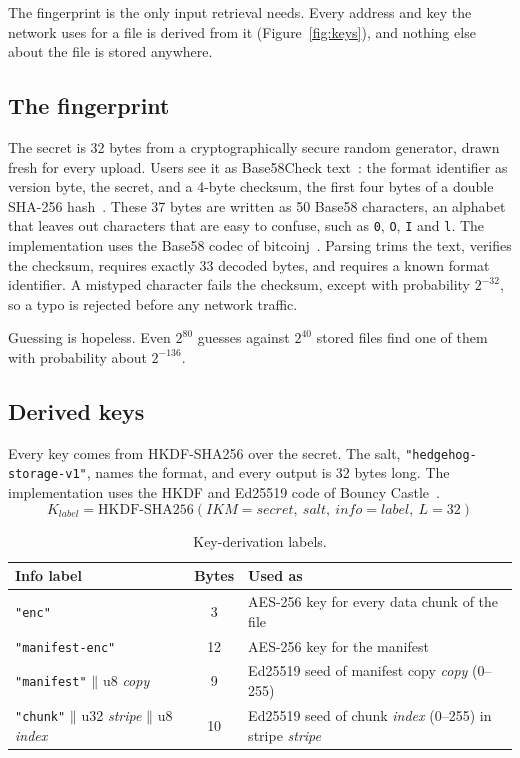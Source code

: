 \documentclass[10pt,a4paper,final]{article}
\newcommand{\code}[1]{\texttt{#1}}
\newcommand{\cat}{\mathbin{\|}}
\begin{document}
The fingerprint is the only input retrieval needs. Every address and key the network uses for a file is derived
from it (Figure~\ref{fig:keys}), and nothing else about the file is stored anywhere.

\subsection{The fingerprint}

The secret is 32 bytes from a cryptographically secure random generator, drawn fresh for every upload. Users see it
as Base58Check text~\cite{base58check}: the format identifier as version byte, the secret, and a 4-byte checksum,
the first four bytes of a double SHA-256 hash~\cite{fips1804}. These 37 bytes are written as 50 Base58 characters,
an alphabet that leaves out characters that are easy to confuse, such as \code{0}, \code{O}, \code{I} and \code{l}. The
implementation uses the Base58 codec of bitcoinj~\cite{bitcoinj}. Parsing trims the text, verifies the checksum,
requires exactly 33 decoded bytes, and requires a known format identifier. A mistyped character fails the checksum,
except with probability $2^{-32}$, so a typo is rejected before any network traffic.

Guessing is hopeless. Even $2^{80}$ guesses against $2^{40}$ stored files find one of them with probability about
$2^{-136}$.

\subsection{Derived keys}

Every key comes from HKDF-SHA256 over the secret. The salt, \code{"hedgehog-storage-v1"}, names the format, and
every output is 32 bytes long. The implementation uses the HKDF and Ed25519 code of Bouncy
Castle~\cite{bouncycastle}.
\begin{equation}
	K_{\mathit{label}} = \mathrm{HKDF\text{-}SHA256}(\mathit{IKM} = \mathit{secret},\ \mathit{salt},\ \mathit{info}
	= \mathit{label},\ L = 32)
\end{equation}

\begin{table}[H]
\centering
\small
\begin{tabularx}{\linewidth}{@{}p{4.6cm}cL@{}}
\toprule
Info label & Bytes & Used as \\
\midrule
\code{"enc"} & 3 & AES-256 key for every data chunk of the file \\
\code{"manifest-enc"} & 12 & AES-256 key for the manifest \\
\code{"manifest"} $\cat$ u8 \textit{copy} & 9 & Ed25519 seed of manifest copy \textit{copy} (0--255) \\
\code{"chunk"} $\cat$ u32 \textit{stripe} $\cat$ u8 \textit{index} & 10 & Ed25519 seed of chunk \textit{index}
(0--255) in stripe \textit{stripe} \\
\bottomrule
\end{tabularx}
\caption{Key-derivation labels.}
\end{table}
\end{document}
